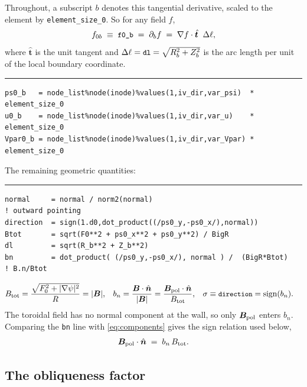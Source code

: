 \documentclass[11pt,a4paper]{article}
\newenvironment{codeline}[1]
  {\par\medskip\noindent\textcolor{coderule}{\rule{\linewidth}{0.4pt}}\par
   \nopagebreak\noindent{\ttfamily\footnotesize\textcolor{keyc}{#1}}\par\nopagebreak\smallskip}
  {\par\medskip}
\newcommand{\code}[1]{\texttt{\small #1}}
\newcommand{\nhat}{\hat{\bm{n}}}
\newcommand{\that}{\hat{\bm{t}}}
\begin{document}
Throughout, a subscript $b$ denotes this tangential derivative, scaled to the element by
\code{element\_size\_0}.  So for any field $f$,
\begin{equation}
  f_{0b} \;\equiv\; \code{f0\_b} \;=\; \partial_b f \;=\; \nabla f \cdot \that \;\; \Delta\ell ,
\end{equation}
where $\that$ is the unit tangent and $\Delta\ell = \code{dl} = \sqrt{R_b^2+Z_b^2}$ is the
arc length per unit of the local boundary coordinate.

\begin{codeline}{mod\_boundary\_conditions.f90:468, 590, 583}
\begin{lstlisting}
ps0_b   = node_list%node(inode)%values(1,iv_dir,var_psi)  * element_size_0
u0_b    = node_list%node(inode)%values(1,iv_dir,var_u)    * element_size_0
Vpar0_b = node_list%node(inode)%values(1,iv_dir,var_Vpar) * element_size_0
\end{lstlisting}
\end{codeline}

\noindent The remaining geometric quantities:

\begin{codeline}{mod\_boundary\_conditions.f90:512--521}
\begin{lstlisting}
normal     = normal / norm2(normal)                                   ! outward pointing
direction  = sign(1.d0,dot_product((/ps0_y,-ps0_x/),normal))
Btot       = sqrt(F0**2 + ps0_x**2 + ps0_y**2) / BigR
dl         = sqrt(R_b**2 + Z_b**2)
bn         = dot_product( (/ps0_y,-ps0_x/), normal ) /  (BigR*Btot)   ! B.n/Btot
\end{lstlisting}
\end{codeline}

\begin{align}
  B_{\rm tot} &= \frac{\sqrt{F_0^2 + |\nabla\psi|^2}}{R} = |\bm{B}| ,
  &
  b_n &= \frac{\bm{B}\cdot\nhat}{|\bm{B}|} = \frac{\bm{B}_{\rm pol}\cdot\nhat}{B_{\rm tot}} ,
  &
  \sigma &\equiv \code{direction} = \operatorname{sign}(b_n) .
  \label{eq:geom}
\end{align}
The toroidal field has no normal component at the wall, so only $\bm{B}_{\rm pol}$ enters
$b_n$.  Comparing the \code{bn} line with \eqref{eq:components} gives the sign relation used
below,
\begin{equation}
  \bm{B}_{\rm pol}\cdot\nhat \;=\; b_n\,B_{\rm tot} .
  \label{eq:bpoln}
\end{equation}

\subsection*{The obliqueness factor}
\end{document}
